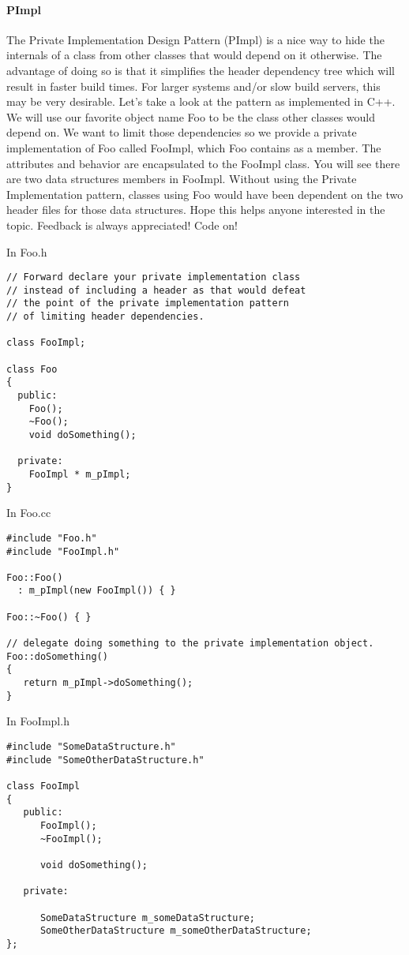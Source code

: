 \documentclass{book}
\begin{document}
\paragraph{PImpl}
The Private Implementation Design Pattern (PImpl) is a nice way to hide the internals of a class from other classes that would depend on it otherwise. 
The advantage of doing so is that it simplifies the header dependency tree which will result in faster build times. 
For larger systems and/or slow build servers, this may be very desirable. Let’s take a look at the pattern as implemented in C++. 
We will use our favorite object name Foo to be the class other classes would depend on. 
We want to limit those dependencies so we provide a private implementation of Foo called FooImpl, which Foo contains as a member. 
The attributes and behavior are encapsulated to the FooImpl class. You will see there are two data structures members in FooImpl. 
Without using the Private Implementation pattern, classes using Foo would have been dependent on the two header files for those data structures. 
Hope this helps anyone interested in the topic. Feedback is always appreciated! Code on!

In Foo.h

\begin{lstlisting}
// Forward declare your private implementation class 
// instead of including a header as that would defeat
// the point of the private implementation pattern
// of limiting header dependencies.

class FooImpl;

class Foo
{
  public:
    Foo();
    ~Foo();
    void doSomething();

  private:
    FooImpl * m_pImpl;
}
\end{lstlisting}
In Foo.cc

\begin{lstlisting}
#include "Foo.h"
#include "FooImpl.h"

Foo::Foo()
  : m_pImpl(new FooImpl()) { }

Foo::~Foo() { }

// delegate doing something to the private implementation object.
Foo::doSomething()
{
   return m_pImpl->doSomething(); 
}
\end{lstlisting}

In FooImpl.h

\begin{lstlisting}
#include "SomeDataStructure.h"
#include "SomeOtherDataStructure.h"

class FooImpl
{
   public:
      FooImpl();
      ~FooImpl();

      void doSomething();

   private:

      SomeDataStructure m_someDataStructure;
      SomeOtherDataStructure m_someOtherDataStructure;
};
\end{lstlisting}
\end{document}
